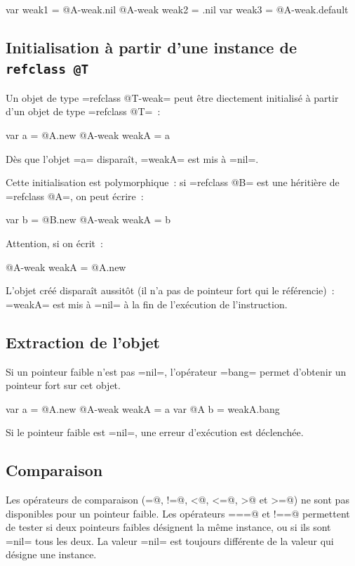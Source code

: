 \begin{galgas4}
  var weak1 = @A-weak.nil
  @A-weak weak2 = .nil
  var weak3 = @A-weak.default
\end{galgas4}


\subsection{Initialisation à partir d'une instance de \texttt{refclass @T}}

Un objet de type \ggsq=refclass @T-weak= peut être diectement initialisé à partir d'un objet de type \ggsq=refclass @T=~:
\begin{galgas4}
  var a = @A.new
  @A-weak weakA = a
\end{galgas4}

Dès que l'objet \ggsq=a= disparaît, \ggsq=weakA= est mis à \ggsq=nil=.

Cette initialisation est polymorphique~: si \ggsq=refclass @B= est une héritière de \ggsq=refclass @A=, on peut écrire~:
\begin{galgas4}
  var b = @B.new
  @A-weak weakA = b
\end{galgas4}

Attention, si on écrit~:
\begin{galgas4}
  @A-weak weakA = @A.new
\end{galgas4}
L'objet créé disparaît aussitôt (il n'a pas de pointeur fort qui le référencie)~: \ggsq=weakA= est mis à \ggsq=nil= à la fin de l'exécution de l'instruction.


\subsection{Extraction de l'objet}

Si un pointeur faible n'est pas \ggsq=nil=, l'opérateur \ggsq=bang= permet d'obtenir un pointeur fort sur cet objet.
\begin{galgas4}
  var a = @A.new
  @A-weak weakA = a
  var @A b = weakA.bang
\end{galgas4}
Si le pointeur faible est \ggsq=nil=, une erreur d'exécution est déclenchée.



\subsection{Comparaison}

Les opérateurs de comparaison (\ggsq@=@, \ggsq@!=@, \ggsq@<@, \ggsq@<=@, \ggsq@>@ et \ggsq@>=@) ne sont pas disponibles pour un pointeur faible. Les opérateurs \ggsq@===@ et \ggsq@!==@ permettent de tester si deux pointeurs faibles désignent la même instance, ou si ils sont \ggsq=nil= tous les deux. La valeur \ggsq=nil= est toujours différente de la valeur qui désigne une instance.


